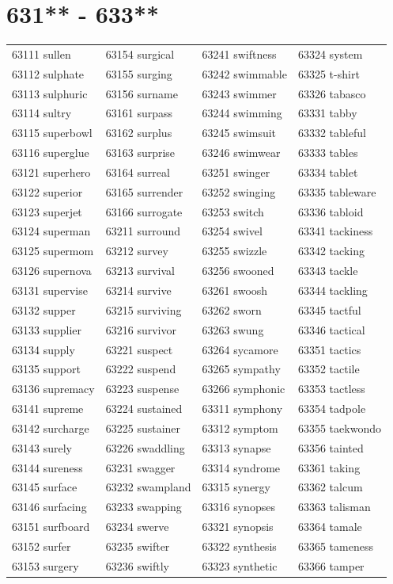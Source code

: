 \documentclass[10pt, oneside]{book}
\begin{document}
\begin{table}
	\centering
	\section*{631** - 633**}
	\begin{tabular}{l l l l}
63111 sullen &63154 surgical &63241 swiftness &63324 system\\
63112 sulphate &63155 surging &63242 swimmable &63325 t-shirt\\
63113 sulphuric &63156 surname &63243 swimmer &63326 tabasco\\
63114 sultry &63161 surpass &63244 swimming &63331 tabby\\
63115 superbowl &63162 surplus &63245 swimsuit &63332 tableful\\
63116 superglue &63163 surprise &63246 swimwear &63333 tables\\
63121 superhero &63164 surreal &63251 swinger &63334 tablet\\
63122 superior &63165 surrender &63252 swinging &63335 tableware\\
63123 superjet &63166 surrogate &63253 switch &63336 tabloid\\
63124 superman &63211 surround &63254 swivel &63341 tackiness\\
63125 supermom &63212 survey &63255 swizzle &63342 tacking\\
63126 supernova &63213 survival &63256 swooned &63343 tackle\\
63131 supervise &63214 survive &63261 swoosh &63344 tackling\\
63132 supper &63215 surviving &63262 sworn &63345 tactful\\
63133 supplier &63216 survivor &63263 swung &63346 tactical\\
63134 supply &63221 suspect &63264 sycamore &63351 tactics\\
63135 support &63222 suspend &63265 sympathy &63352 tactile\\
63136 supremacy &63223 suspense &63266 symphonic &63353 tactless\\
63141 supreme &63224 sustained &63311 symphony &63354 tadpole\\
63142 surcharge &63225 sustainer &63312 symptom &63355 taekwondo\\
63143 surely &63226 swaddling &63313 synapse &63356 tainted\\
63144 sureness &63231 swagger &63314 syndrome &63361 taking\\
63145 surface &63232 swampland &63315 synergy &63362 talcum\\
63146 surfacing &63233 swapping &63316 synopses &63363 talisman\\
63151 surfboard &63234 swerve &63321 synopsis &63364 tamale\\
63152 surfer &63235 swifter &63322 synthesis &63365 tameness\\
63153 surgery &63236 swiftly &63323 synthetic &63366 tamper\\
	\end{tabular}
 \end{table}
\clearpage
\end{document}

